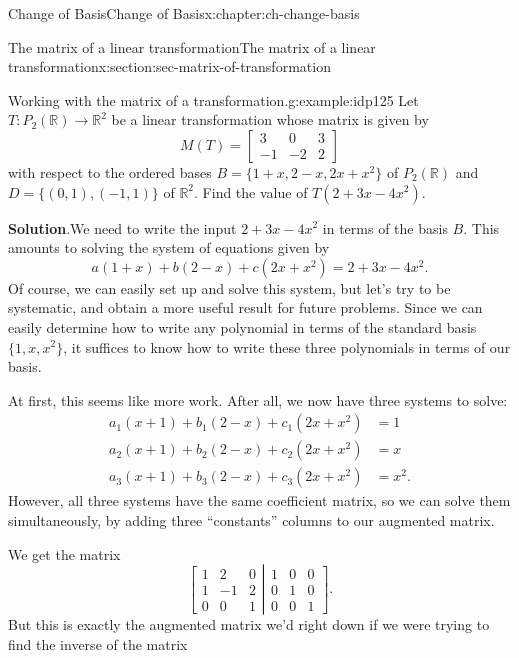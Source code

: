 \documentclass[oneside,10pt,]{book}
\newcommand{\blocktitlefont}{\relax}
\numberwithin{equation}{section}
\newcommand{\bbm}{\begin{bmatrix}}
\newcommand{\ebm}{\end{bmatrix}}
\newcommand{\R}{\mathbb{R}}
\newcommand{\amp}{&}
\begin{document}
\begin{chapterptx}{Change of Basis}{}{Change of Basis}{}{}{x:chapter:ch-change-basis}
\begin{sectionptx}{The matrix of a linear transformation}{}{The matrix of a linear transformation}{}{}{x:section:sec-matrix-of-transformation}
\begin{example}{Working with the matrix of a transformation.}{g:example:idp125}%
Let \(T:P_2(\R)\to \R^2\) be a linear transformation whose matrix is given by%
\begin{equation*}
M(T) = \bbm 3\amp 0 \amp 3\\-1\amp -2\amp 2\ebm
\end{equation*}
with respect to the ordered bases \(B = \{1+x, 2-x, 2x+x^2\}\) of  \(P_2(\R)\) and \(D = \{(0,1),(-1,1)\}\) of \(\R^2\). Find the value of \(T(2+3x-4x^2)\).%
\par\smallskip%
\noindent\textbf{\blocktitlefont Solution}.\hypertarget{g:solution:idp126}{}\quad{}We need to write the input \(2+3x-4x^2\) in terms of the basis \(B\). This amounts to solving the system of equations given by%
\begin{equation*}
a(1+x)+b(2-x)+c(2x+x^2)=2+3x-4x^2\text{.}
\end{equation*}
Of course, we can easily set up and solve this system, but let's try to be systematic, and obtain a more useful result for future problems. Since we can easily determine how to write any polynomial in terms of the standard basis \(\{1,x,x^2\}\), it suffices to know how to write these three polynomials in terms of our basis.%
\par
At first, this seems like more work. After all, we now have three systems to solve:%
\begin{align*}
a_1(x+1)+b_1(2-x)+c_1(2x+x^2) \amp =1\\
a_2(x+1)+b_2(2-x)+c_2(2x+x^2) \amp =x\\
a_3(x+1)+b_3(2-x)+c_3(2x+x^2) \amp =x^2\text{.}
\end{align*}
However, all three systems have the same coefficient matrix, so we can solve them simultaneously, by adding three ``constants'' columns to our augmented matrix.%
\par
We get the matrix%
\begin{equation*}
\left[\begin{matrix}1\amp 2\amp 0\\1\amp -1\amp 2\\0\amp 0\amp 1\end{matrix}
\right\rvert\left.\begin{matrix}1\amp 0\amp 0\\0\amp 1\amp 0\\0\amp 0\amp 1\end{matrix}\right]\text{.}
\end{equation*}
But this is exactly the augmented matrix we'd right down if we were trying to find the inverse of the matrix%

\end{example}
\end{sectionptx}
\end{chapterptx}
\end{document}
